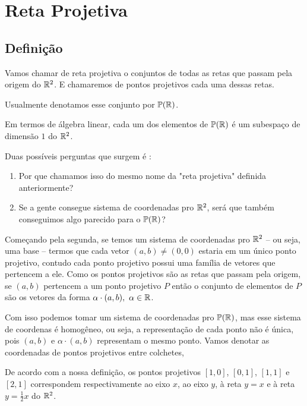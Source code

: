 \chapter{Reta Projetiva}

\section{Definição}

\begin{defn}
Vamos chamar de reta projetiva o conjuntos de todas as retas que passam pela origem do $\mathbb{R}^2$. E chamaremos de pontos projetivos cada uma dessas retas.
\end{defn}
Usualmente denotamos esse conjunto por $\mathbb{P}(\mathbb{R})$.

Em termos de álgebra linear, cada um dos elementos de $\mathbb{P}(\mathbb{R})$ é um subespaço de dimensão $1$ do $\mathbb{R}^2$.

Duas possíveis perguntas que surgem é : 
\begin{enumerate}
    \item Por que chamamos isso
do mesmo nome da "reta projetiva"  definida anteriormente? %
    \item Se a gente consegue sistema de coordenadas pro $\mathbb{R}^2$, será que também conseguimos algo parecido para o $\mathbb{P}(\mathbb{R})$?
\end{enumerate}

Começando pela segunda, se temos um sistema de coordenadas pro $\mathbb{R}^2$ -- ou seja, uma base -- termos que cada vetor $(a,b) \ne (0,0)$ estaria em um único ponto projetivo, contudo cada ponto projetivo possui uma família de vetores que pertencem a ele. Como os pontos projetivos são as retas que passam pela origem, se $(a,b)$ pertencem a um ponto projetivo $P$ então o conjunto de elementos de $P$ são os vetores da forma $\alpha \cdot (a,b), \ \alpha \in \RR$.

Com isso podemos tomar um sistema de coordenadas pro $\mathbb{P}(\mathbb{R})$, mas esse sistema de coordenas é homogêneo, ou seja, a representação de cada ponto não é única, pois $(a,b)$ e $\alpha \cdot (a,b)$ representam o mesmo ponto. Vamos denotar as coordenadas de pontos projetivos entre colchetes, 

\begin{exmp}
De acordo com a nossa definição, os pontos projetivos $[1,0]$, $[0,1]$, $[1,1]$ e $[2,1]$ correspondem respectivamente ao eixo $x$, ao eixo $y$, à reta $y=x$ e à reta $y=\frac{1}{2}x$ do $\mathbb{R}^2$.
\end{exmp}

